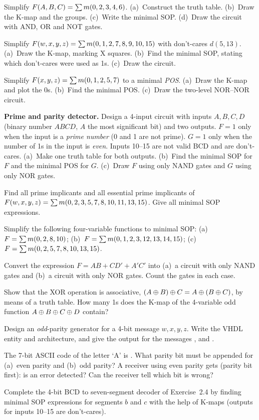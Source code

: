 \begin{exlist}
  \item Simplify $F(A,B,C)=\sum m(0,2,3,4,6)$. (a)~Construct the truth table. (b)~Draw the K-map and the groups. (c)~Write the minimal SOP. (d)~Draw the circuit with AND, OR and NOT gates.
  \item Simplify $F(w,x,y,z)=\sum m(0,1,2,7,8,9,10,15)$ with don't-cares $d(5,13)$. (a)~Draw the K-map, marking X squares. (b)~Find the minimal SOP, stating which don't-cares were used as 1s. (c)~Draw the circuit.
  \item Simplify $F(x,y,z)=\sum m(0,1,2,5,7)$ to a minimal \emph{POS}. (a)~Draw the K-map and plot the 0s. (b)~Find the minimal POS. (c)~Draw the two-level NOR--NOR circuit.
  \item \textbf{Prime and parity detector.} Design a 4-input circuit with inputs $A,B,C,D$ (binary number $ABCD$, $A$ the most significant bit) and two outputs. $F=1$ only when the input is a \emph{prime number} (0 and 1 are not prime). $G=1$ only when the number of 1s in the input is \emph{even}. Inputs 10--15 are not valid BCD and are don't-cares. (a)~Make one truth table for both outputs. (b)~Find the minimal SOP for $F$ and the minimal POS for $G$. (c)~Draw $F$ using only NAND gates and $G$ using only NOR gates.
  \item Find all prime implicants and all essential prime implicants of $F(w,x,y,z)=\sum m(0,2,3,5,7,8,10,11,13,15)$. Give all minimal SOP expressions.
  \item Simplify the following four-variable functions to minimal SOP: (a)~$F=\sum m(0,2,8,10)$; (b)~$F=\sum m(0,1,2,3,12,13,14,15)$; (c)~$F=\sum m(0,2,5,7,8,10,13,15)$.
  \item Convert the expression $F=AB+CD'+A'C'$ into (a)~a circuit with only NAND gates and (b)~a circuit with only NOR gates. Count the gates in each case.
  \item Show that the XOR operation is associative, $(A\oplus B)\oplus C = A\oplus(B\oplus C)$, by means of a truth table. How many 1s does the K-map of the 4-variable odd function $A\oplus B\oplus C\oplus D$ contain?
  \item Design an \emph{odd}-parity generator for a 4-bit message $w,x,y,z$. Write the VHDL entity and architecture, and give the output for the messages ,  and .
  \item The 7-bit ASCII code of the letter `A' is . What parity bit must be appended for (a)~even parity and (b)~odd parity? A receiver using even parity gets  (parity bit first): is an error detected? Can the receiver tell which bit is wrong?
  \item Complete the 4-bit BCD to seven-segment decoder of Exercise~2.4 by finding minimal SOP expressions for segments $b$ and $c$ with the help of K-maps (outputs for inputs 10--15 are don't-cares).
\end{exlist}


